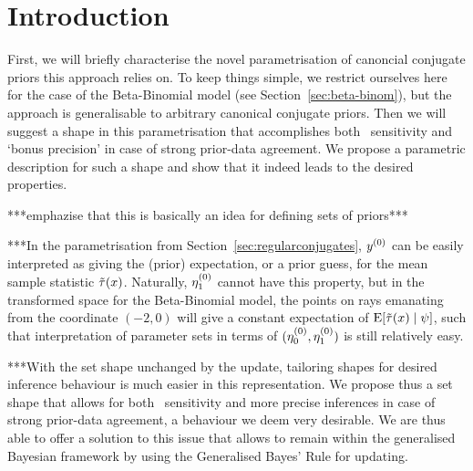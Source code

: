 
\def\El{\ul{\E}}
\def\Eu{\ol{\E}}

\def\Pl{\ul{\p}}
\def\Pu{\ol{\p}}

\newcommand{\ber}{\operatorname{Ber}}   %
\newcommand{\bin}{\operatorname{Binom}} %
\newcommand{\be}{\operatorname{Beta}}   %
\newcommand{\B}{\operatorname{B}}   %




\section{Introduction}

First, we will briefly characterise the novel parametrisation of canoncial conjugate priors this approach relies on.
To keep things simple, we restrict ourselves here for the case of the Beta-Binomial model (see Section~\ref{sec:beta-binom}),
but the approach is generalisable to arbitrary canonical conjugate priors.
Then we will suggest a shape in this parametrisation that accomplishes
both \pdc\ sensitivity and `bonus precision' in case of strong prior-data agreement.
We propose a parametric description for such a shape
and show that it indeed leads to the desired properties.

***emphazise that this is basically an idea for defining sets of priors***



***In the parametrisation from Section~\ref{sec:regularconjugates},
$y^{(0)}$ can be easily interpreted as
giving the (prior) expectation, or a prior guess, for the mean sample statistic $\tilde{\tau}(x)$.
Naturally, $\eta_1^{(0)}$ cannot have this property,
but in the transformed space for the Beta-Binomial model, the points on rays emanating from the coordinate $(-2,0)$
will give a constant expectation of $\operatorname{E}[\tilde{\tau}(x) \mid \psi]$,
such that interpretation of parameter sets in terms of $(\eta_0^{(0)},\eta_1^{(0)})$ is still relatively easy.

***With the set shape unchanged by the update, 
tailoring shapes for desired inference behaviour is much easier in this representation.
We propose thus a set shape %
that allows for both \pdc\ sensitivity
and more precise inferences in case of strong prior-data agreement,
a behaviour we deem very desirable.
We are thus able to offer a solution to this issue that allows to remain within the generalised Bayesian framework
by using the Generalised Bayes' Rule for updating.




